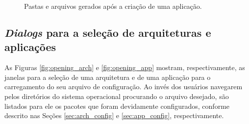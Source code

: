             \begin{figure}[htb]
                \centering
                
                \caption{Pastas e arquivos gerados após a criação de uma aplicação.} \label{fig:example}
            \end{figure}
            
        \subsection{\textit{Dialogs} para a seleção de arquiteturas e aplicações} \label{subsec:dialogs_open}
            As Figuras \ref{fig:opening_arch} e \ref{fig:opening_app} mostram, respectivamente, as janelas para a seleção de uma arquitetura e de uma aplicação para o carregamento do seu arquivo de configuração. Ao invés dos usuários navegarem pelos diretórios do sistema operacional procurando o arquivo desejado, são listados para ele os pacotes que foram devidamente configurados, conforme descrito nas Seções \ref{sec:arch_config} e \ref{sec:app_config}, respectivamente. 
            
